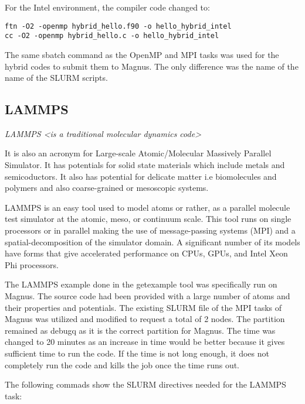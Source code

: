 \documentclass[journal]{IEEEtran}
\begin{document}
For the Intel environment, the compiler code changed to:
\begin{verbatim}
ftn -O2 -openmp hybrid_hello.f90 -o hello_hybrid_intel
cc -O2 -openmp hybrid_hello.c -o hello_hybrid_intel
\end{verbatim}

The same sbatch command as the OpenMP and MPI tasks was used for the hybrid codes to submit them to Magnus. The only difference was the name of the name
of the SLURM scripts.


\subsection{LAMMPS}

\emph{LAMMPS <is a traditional molecular dynamics code>} 

It is also an acronym for Large-scale Atomic/Molecular Massively Parallel Simulator. It has potentials
for solid state materials which include metals and semicoductors. It also has potential for delicate matter i.e biomolecules and polymers and also
coarse-grained or mesoscopic systems.

LAMMPS is an easy tool used to model atoms or rather, as a parallel molecule test simulator at the atomic, meso, or continuum scale. This tool runs on
single processors or in parallel making the use of message-passing systems (MPI) and a spatial-decomposition of the simulator domain. A significant
number of its models have forms that give accelerated performance on CPUs, GPUs, and Intel Xeon Phi processors.

The LAMMPS example done in the getexample tool was specifically run on Magnus. The source code had been provided with a large number of atoms and their
properties and potentials. The existing SLURM file of the MPI tasks of Magnus was utilized and modified to request a total of 2 nodes. The partition
remained as debugq as it is the correct partition for Magnus. The time was changed to 20 minutes as an increase in time would be better because it gives
sufficient time to run the code. If the time is not long enough, it does not completely run the code and kills the job once the time runs out.

The following commads show the SLURM directives needed for the LAMMPS task:



\end{document}
